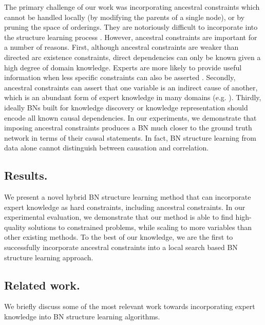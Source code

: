 \documentclass[twoside,11pt]{article}
\begin{document}
\smallskip
The primary challenge of our work was incorporating ancestral constraints which cannot be
handled locally (by modifying the parents of a single node), or by pruning the space of orderings.
They are notoriously difficult to incorporate into the structure learning process \citep{Chen2016}. However, ancestral constraints are important 
for a number of reasons. First, although ancestral
constraints are weaker than directed arc existence constraints, direct dependencies can only be known given a high degree of 
domain knowledge. Experts are more likely to provide useful information when less specific constraints can also be asserted \citep{Flores2011}.
Secondly, ancestral constraints can assert that one variable is an indirect cause of another, which is an abundant form of expert
knowledge in many domains (e.g. \cite{Sahin2006, Ma2017, Leu2013, Chen2014, Giordano2013}). Thirdly, ideally BNs built for knowledge discovery
or knowledge representation should encode all known causal dependencies. In our experiments, we demonstrate that imposing ancestral
constraints produces a BN much closer to the ground truth network in terms of their causal statements. In fact, BN structure
learning from data alone cannot distinguish between causation and correlation.

\subsection{Results.} We present a novel hybrid BN structure learning method that can incorporate expert knowledge as hard constraints,
including ancestral constraints. In our experimental evaluation, we demonstrate that our method is able to find high-quality solutions to 
constrained problems, while scaling to more variables than other existing methods. To the best of our knowledge, we are the first to 
successfully incorporate ancestral constraints into a local search based BN structure learning approach. 


\subsection{Related work.} We briefly discuss some of the most relevant work towards incorporating expert knowledge into
BN structure learning algorithms.
\end{document}
